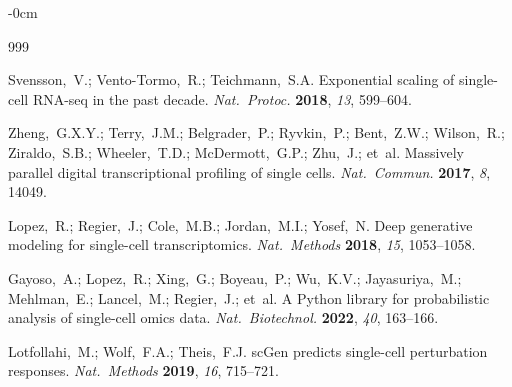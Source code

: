 \documentclass[genes,article,submit,pdftex,oneauthor]{Definitions/mdpi}
\begin{document}
\begin{adjustwidth}{-\extralength}{0cm}





\begin{thebibliography}{999}
\setlength{\itemsep}{0pt}\setlength{\parskip}{0pt}\setlength{\parsep}{0pt}

Svensson,~V.; Vento-Tormo,~R.; Teichmann,~S.A. Exponential scaling of single-cell RNA-seq in the past decade. {\em Nat.\ Protoc.} {\bf 2018}, {\em 13}, 599--604.

Zheng,~G.X.Y.; Terry,~J.M.; Belgrader,~P.; Ryvkin,~P.; Bent,~Z.W.; Wilson,~R.; Ziraldo,~S.B.; Wheeler,~T.D.; McDermott,~G.P.; Zhu,~J.; et~al. Massively parallel digital transcriptional profiling of single cells. {\em Nat.\ Commun.} {\bf 2017}, {\em 8}, 14049.

Lopez,~R.; Regier,~J.; Cole,~M.B.; Jordan,~M.I.; Yosef,~N. Deep generative modeling for single-cell transcriptomics. {\em Nat.\ Methods} {\bf 2018}, {\em 15}, 1053--1058.

Gayoso,~A.; Lopez,~R.; Xing,~G.; Boyeau,~P.; Wu,~K.V.; Jayasuriya,~M.; Mehlman,~E.; Lancel,~M.; Regier,~J.; et~al. A Python library for probabilistic analysis of single-cell omics data. {\em Nat.\ Biotechnol.} {\bf 2022}, {\em 40}, 163--166.

Lotfollahi,~M.; Wolf,~F.A.; Theis,~F.J. scGen predicts single-cell perturbation responses. {\em Nat.\ Methods} {\bf 2019}, {\em 16}, 715--721.


\end{thebibliography}
\end{adjustwidth}
\end{document}
